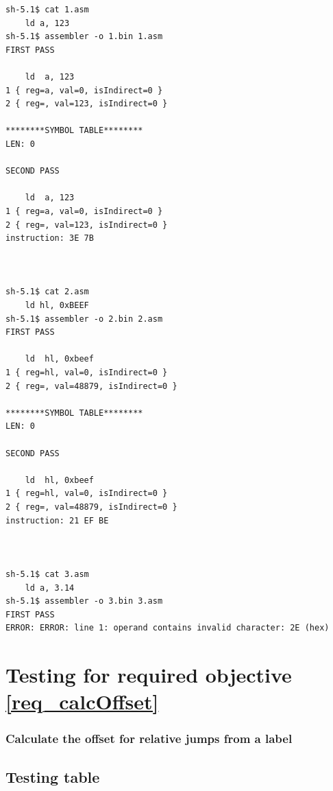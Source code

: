 \documentclass[a4paper]{report}
\begin{document}
\begin{lstlisting}
sh-5.1$ cat 1.asm
	ld a, 123
sh-5.1$ assembler -o 1.bin 1.asm
FIRST PASS

	ld	a, 123
1 { reg=a, val=0, isIndirect=0 }
2 { reg=, val=123, isIndirect=0 }

********SYMBOL TABLE********
LEN: 0

SECOND PASS

	ld	a, 123
1 { reg=a, val=0, isIndirect=0 }
2 { reg=, val=123, isIndirect=0 }
instruction: 3E 7B



sh-5.1$ cat 2.asm
	ld hl, 0xBEEF
sh-5.1$ assembler -o 2.bin 2.asm
FIRST PASS

	ld	hl, 0xbeef
1 { reg=hl, val=0, isIndirect=0 }
2 { reg=, val=48879, isIndirect=0 }

********SYMBOL TABLE********
LEN: 0

SECOND PASS

	ld	hl, 0xbeef
1 { reg=hl, val=0, isIndirect=0 }
2 { reg=, val=48879, isIndirect=0 }
instruction: 21 EF BE



sh-5.1$ cat 3.asm
	ld a, 3.14
sh-5.1$ assembler -o 3.bin 3.asm
FIRST PASS
ERROR: ERROR: line 1: operand contains invalid character: 2E (hex)
\end{lstlisting}

\section{Testing for required objective \ref{req_calcOffset}}

\subsubsection{Calculate the offset for relative jumps from a label}

\subsection{Testing table}
\end{document}
